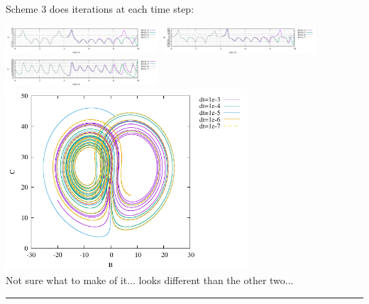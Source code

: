 Scheme 3 does iterations at each time step:

\begin{center}
\includegraphics[width=5.7cm]{python_codes/fieldstone_156/results/scheme3/A.pdf}
\includegraphics[width=5.7cm]{python_codes/fieldstone_156/results/scheme3/B.pdf}
\includegraphics[width=5.7cm]{python_codes/fieldstone_156/results/scheme3/C.pdf}\\
\includegraphics[width=9cm]{python_codes/fieldstone_156/results/scheme3/BC.pdf}\\
{\captionfont Not sure what to make of it... looks different than the other two...}
\end{center}



\par\noindent\rule{\textwidth}{0.4pt}

\vspace{.5cm}

\begin{center}
\end{center}



